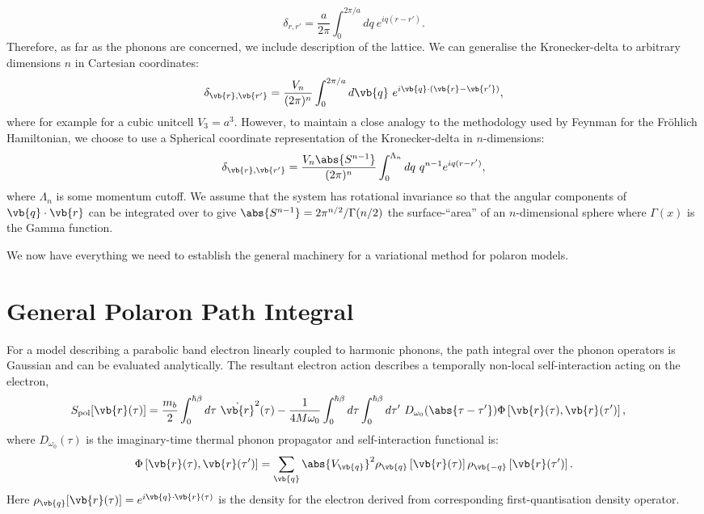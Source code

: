 \begin{equation}
    \delta _{r, r'} = \frac{a}{2\pi} \int_0^{2\pi / a} dq\ e^{i q (r - r')} .
\end{equation}
Therefore, as far as the phonons are concerned, we include description of the lattice. We can generalise the Kronecker-delta to arbitrary dimensions $n$ in Cartesian coordinates:
\begin{equation}
    \delta_{\vb{r}, \vb{r'}} = \frac{V_n}{(2\pi)^n} \int_0^{2\pi/a} d\vb{q}\ e^{i \vb{q} \cdot (\vb{r} - \vb{r'})} ,
\end{equation}
where for example for a cubic unitcell $V_3 = a^3$. However, to maintain a close analogy to the methodology used by Feynman for the Fr\"ohlich Hamiltonian, we choose to use a Spherical coordinate representation of the Kronecker-delta in $n$-dimensions:
\begin{equation}
    \delta_{\vb{r}, \vb{r'}} = \frac{V_n \abs{S^{n-1}}}{(2\pi)^n} \int_0^{\Lambda_n} dq\ q^{n-1} e^{i q (r - r')} ,
\end{equation}
where $\Lambda_n$ is some momentum cutoff. We assume that the system has rotational invariance so that the angular components of $\vb{q} \cdot \vb{r}$ can be integrated over to give $\abs{S^{n-1}} = 2\pi^{n/2} / \Gamma(n/2)$ the surface-``area'' of an $n$-dimensional sphere where $\Gamma(x)$ is the Gamma function.
\newline

We now have everything we need to establish the general machinery for a variational method for polaron models.

\section{General Polaron Path Integral}

For a model describing a parabolic band electron linearly coupled to harmonic phonons, the path integral over the phonon operators is Gaussian and can be evaluated analytically. The resultant electron action describes a temporally non-local self-interaction acting on the electron,
\begin{equation} \label{eqn:eph-action}
    \begin{aligned}
        S_{\text{pol}}[\vb{r}(\tau)] &= \frac{m_b}{2} \int_0^{\hbar\beta} d\tau\ \Dot{\vb{r}}^2(\tau) - \frac{1}{4 M \omega_0} \int_0^{\hbar\beta} d\tau \int_0^{\hbar\beta} d\tau'\ D_{\omega_0}(\abs{\tau - \tau'}) \Phi\left[\vb{r}(\tau), \vb{r}(\tau')\right] ,
    \end{aligned}
\end{equation}
where $ D_{\omega_0}(\tau)$ is the imaginary-time thermal phonon propagator and self-interaction functional is:
\begin{equation}
    \Phi\left[\vb{r}(\tau), \vb{r}(\tau')\right] = \sum_{\vb{q}} \abs{V_{\vb{q}}}^2 \rho_{\vb{q}} \left[\vb{r}(\tau)\right] \rho_{\vb{-q}}\left[\vb{r}(\tau')\right].
\end{equation}
Here $\rho_{\vb{q}}[\vb{r}(\tau)] = e^{i \vb{q} \cdot \vb{r}(\tau)}$ is the density for the electron derived from corresponding first-quantisation density operator.
\newline

